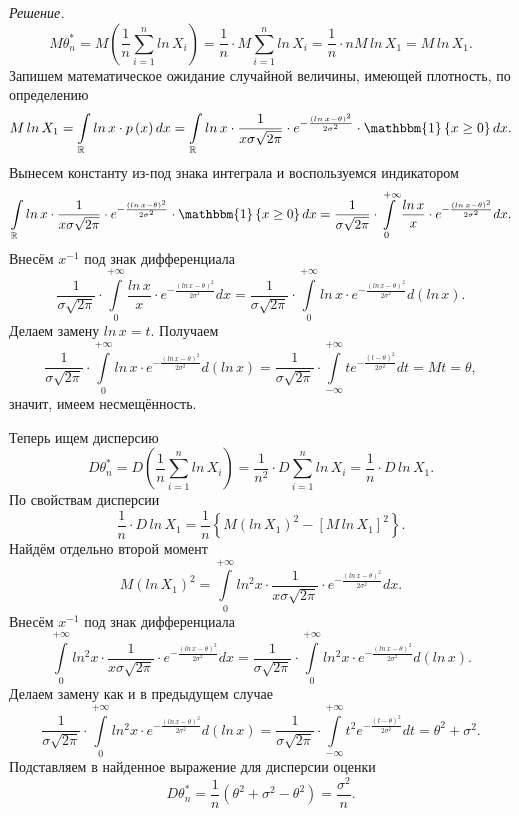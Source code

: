\textit{Решение.}
$$M \theta_n^* =
  M \left( \frac{1}{n} \sum \limits_{i = 1}^n ln \, X_i \right) =
  \frac{1}{n} \cdot M \sum \limits_{i = 1}^n ln \, X_i =
  \frac{1}{n} \cdot nM \, ln \, X_1 =
  M \, ln \, X_1.$$
Запишем математическое ожидание случайной величины, имеющей плотность, по определению
$$M \, ln \, X_1 =
  \int \limits_{ \mathbb{R}} ln \, x \cdot p \left( x \right) dx =
  \int \limits_{ \mathbb{R}}
    ln \, x \cdot \frac{1}{x \sigma \sqrt{2 \pi }} \cdot
    e^{- \frac{ \left( ln \, x - \theta \right)^2}{2 \sigma^2}} \cdot
    \mathbbm{1} \left\{ x \geq 0 \right\} dx.$$
Вынесем константу из-под знака интеграла и воспользуемся индикатором
$$ \int \limits_{ \mathbb{R}}
    ln \, x \cdot \frac{1}{x \sigma \sqrt{2 \pi }} \cdot
    e^{- \frac{ \left( ln \, x - \theta \right)^2}{2 \sigma^2}} \cdot
    \mathbbm{1} \left\{ x \geq 0 \right\} dx =
  \frac{1}{ \sigma \sqrt{2 \pi }} \cdot
  \int \limits_0^{+ \infty }
    \frac{ln \, x}{x} \cdot e^{- \frac{ \left( ln \, x - \theta \right)^2}{2 \sigma^2}} dx.$$
Внесём $x^{-1}$ под знак дифференциала
$$ \frac{1}{ \sigma \sqrt{2 \pi }} \cdot
  \int \limits_0^{+ \infty }
    \frac{ln \, x}{x} \cdot e^{- \frac{ \left( ln \, x - \theta \right)^2}{2 \sigma^2}} dx =
  \frac{1}{ \sigma \sqrt{2 \pi }} \cdot
  \int \limits_0^{+ \infty}
    ln \, x \cdot e^{- \frac{ \left( ln \, x - \theta \right)^2}{2 \sigma^2}}
  d \left( ln \, x \right).$$
Делаем замену $ln \, x = t$.
Получаем
$$ \frac{1}{ \sigma \sqrt{2 \pi }} \cdot
  \int \limits_0^{+ \infty}
    ln \, x \cdot e^{- \frac{ \left( ln \, x - \theta \right)^2}{2 \sigma^2}}
  d \left( ln \, x \right) =
  \frac{1}{ \sigma \sqrt{2 \pi }} \cdot
  \int \limits_{- \infty }^{+ \infty } te^{- \frac{ \left( t - \theta \right)^2}{2 \sigma^2}} dt =
  Mt =
  \theta,$$
значит, имеем несмещённость.

Теперь ищем дисперсию
$$D \theta_n^* =
  D \left( \frac{1}{n} \sum \limits_{i = 1}^n ln \, X_i \right) =
  \frac{1}{n^2} \cdot D \sum \limits_{i = 1}^n ln \, X_i =
  \frac{1}{n} \cdot D \, ln \, X_1.$$
По свойствам дисперсии
$$ \frac{1}{n} \cdot D \, ln \, X_1 =
  \frac{1}{n} \left\{ M \left( ln \, X_1 \right)^2 - \left[ M \, ln \, X_1 \right]^2 \right\}.$$
Найдём отдельно второй момент
$$M \left( ln \, X_1 \right)^2 =
  \int \limits_0^{+ \infty }
    ln^2 x \cdot \frac{1}{x \sigma \sqrt{2 \pi }} \cdot
    e^{- \frac{ \left( ln \, x - \theta \right)^2}{2 \sigma^2}} dx.$$
Внесём $x^{-1}$ под знак дифференциала
$$ \int \limits_0^{+ \infty }
    ln^2 x \cdot \frac{1}{x \sigma \sqrt{2 \pi }} \cdot
    e^{- \frac{ \left( ln \, x - \theta \right)^2}{2 \sigma^2}} dx =
  \frac{1}{ \sigma \sqrt{2 \pi }} \cdot
  \int \limits_0^{+ \infty }
    ln^2 x \cdot e^{- \frac{ \left( ln \, x - \theta \right)^2}{2 \sigma^2}}
  d \left( ln \, x \right).$$
Делаем замену как и в предыдущем случае
$$ \frac{1}{ \sigma \sqrt{2 \pi }} \cdot
  \int \limits_0^{+ \infty }
    ln^2 x \cdot e^{- \frac{ \left( ln \, x - \theta \right)^2}{2 \sigma^2}}
  d \left( ln \, x \right) =
  \frac{1}{ \sigma \sqrt{2 \pi }} \cdot
  \int \limits_{- \infty }^{+ \infty }
    t^2 e^{- \frac{ \left( t - \theta \right)^2}{2 \sigma^2}} dt =
  \theta^2 + \sigma^2.$$
Подставляем в найденное выражение для дисперсии оценки
$$D \theta_n^* =
  \frac{1}{n} \left( \theta^2 + \sigma^2 - \theta^2 \right) =
  \frac{ \sigma^2}{n}.$$

